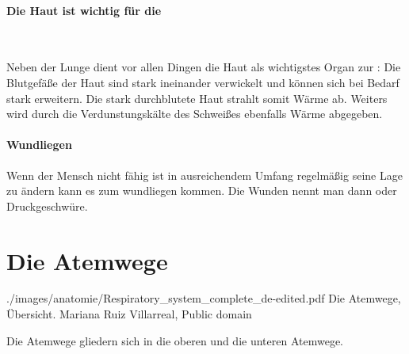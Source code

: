 \paragraph{Die Haut ist wichtig für die
}~

Neben der Lunge dient vor allen Dingen  die Haut als wichtigstes Organ
zur : Die Blutgefäße  der  Haut
sind stark ineinander verwickelt und können sich bei Bedarf stark erweitern. Die
stark durchblutete  Haut strahlt somit Wärme ab. Weiters wird durch
die Verdunstungskälte  des Schweißes  ebenfalls Wärme
abgegeben. 

\paragraph{Wundliegen}
\label{topic:dekubitus}Wenn der Mensch nicht
fähig ist in ausreichendem Umfang regelmäßig seine Lage zu ändern kann es zum
wundliegen kommen. Die Wunden nennt man dann  oder Druckgeschwüre.


\clearpage
\section{Die Atemwege}



{}
{}
{./images/anatomie/Respiratory_system_complete_de-edited.pdf}
{Die Atemwege, Übersicht.\label{fig:respiraktionstrakt-uebersicht}}
{Mariana Ruiz Villarreal, Public domain}




Die Atemwege gliedern sich in die oberen und die unteren Atemwege.

